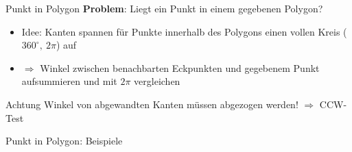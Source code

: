 \begin{frame}{Punkt in Polygon}
	\textbf{Problem}: Liegt ein Punkt in einem gegebenen Polygon?
	\begin{itemize}
		\item Idee: Kanten spannen für Punkte innerhalb des Polygons einen vollen Kreis ($360^\circ,\ 2\pi$) auf
		\item $\Rightarrow$ Winkel zwischen benachbarten Eckpunkten und gegebenem Punkt aufsummieren und mit $2\pi$ vergleichen
	\end{itemize}
	\begin{alertblock}{Achtung}
		Winkel von abgewandten Kanten müssen abgezogen werden! $\Rightarrow$ CCW-Test
	\end{alertblock}
\end{frame}

\begin{frame}{Punkt in Polygon: Beispiele}
	\begin{center}

\end{center}
\end{frame}
